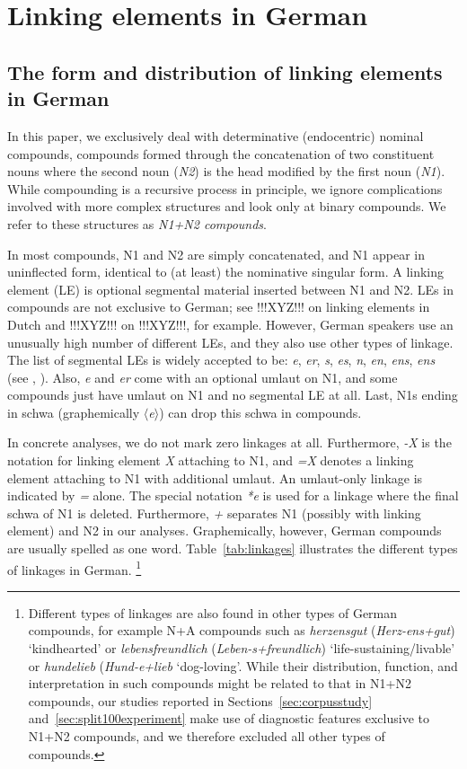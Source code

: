 \section{Linking elements in German}
\label{sec:linkingelementsingerman}

\subsection{The form and distribution of linking elements in German}
\label{sec:theformanddistributionoflinkingelementsingerman}

In this paper, we exclusively deal with determinative (endocentric) nominal compounds, \ie compounds formed through the concatenation of two constituent nouns where the second noun (\textit{N2}) is the head modified by the first noun (\textit{N1}).
While compounding is a recursive process in principle, we ignore complications involved with more complex structures and look only at binary compounds.
We refer to these structures as \textit{N1+N2 compounds}.

In most compounds, N1 and N2 are simply concatenated, and N1 appear in uninflected form, identical to (at least) the nominative singular form.
A linking element (LE) is optional segmental material inserted between N1 and N2.
LEs in compounds are not exclusive to German; see !!!XYZ!!! on linking elements in Dutch and !!!XYZ!!! on !!!XYZ!!!, for example.
However, German speakers use an unusually high number of different LEs, and they also use other types of linkage.
The list of segmental LEs is widely accepted to be: \textit{e}, \textit{er}, \textit{s}, \textit{es}, \textit{n}, \textit{en}, \textit{ens}, \textit{ens} (see \citealt[31]{Neef2015}, \citealt{KrottEa2007}).
Also, \textit{e} and \textit{er} come with an optional umlaut on N1, and some compounds just have umlaut on N1 and no segmental LE at all.
Last, N1s ending in schwa (graphemically \textit{$\langle$e$\rangle$}) can drop this schwa in compounds.

In concrete analyses, we do not mark zero linkages at all.
Furthermore, \textit{-X} is the notation for linking element \textit{X} attaching to N1, and \textit{=X} denotes a linking element attaching to N1 with additional umlaut.
An umlaut-only linkage is indicated by \textit{=} alone.
The special notation \textit{*e} is used for a linkage where the final schwa of N1 is deleted.
Furthermore, \textit{+} separates N1 (possibly with linking element) and N2 in our analyses.
Graphemically, however, German compounds are usually spelled as one word.
Table~\ref{tab:linkages} illustrates the different types of linkages in German.%
\footnote{Different types of linkages are also found in other types of German compounds, for example N+A compounds such as \textit{herzensgut} (\textit{Herz-ens+gut}) `kindhearted' or \textit{lebensfreundlich} (\textit{Leben-s+freundlich}) `life-sustaining\slash livable' or \textit{hundelieb} (\textit{Hund-e+lieb} `dog-loving'.
While their distribution, function, and interpretation in such compounds might be related to that in N1+N2 compounds, our studies reported in Sections~\ref{sec:corpusstudy} and~\ref{sec:split100experiment} make use of diagnostic features exclusive to N1+N2 compounds, and we therefore excluded all other types of compounds.}

